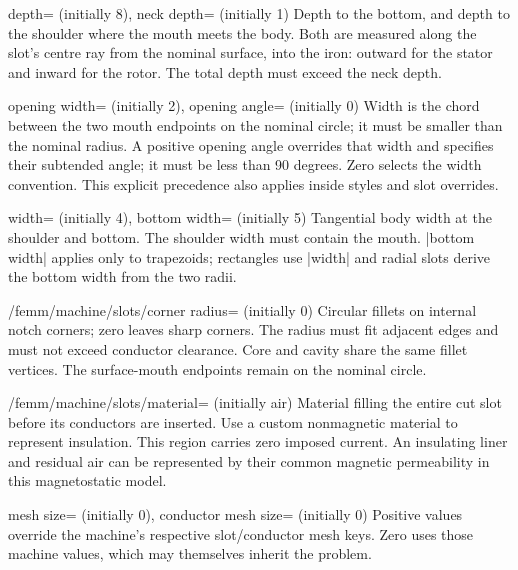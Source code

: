 \begin{keylist}{depth= (initially 8),
 neck depth= (initially 1)}
Depth to the bottom, and depth to the shoulder where the mouth meets the
body. Both are measured along the slot's centre ray from the nominal surface,
into the iron: outward for the stator and inward for the rotor.
The total depth must exceed the neck depth.
\end{keylist}
\begin{keylist}{opening width= (initially 2),
 opening angle= (initially 0)}
Width is the chord between the two mouth endpoints on the nominal circle;
it must be smaller than the nominal radius.
A positive opening angle overrides that width and specifies their subtended
angle; it must be less than 90 degrees. Zero selects the width convention.
This explicit precedence also applies inside styles and slot overrides.
\end{keylist}
\begin{keylist}{width= (initially 4),
 bottom width= (initially 5)}
Tangential body width at the shoulder and bottom. The shoulder width must
contain the mouth. |bottom width| applies only to trapezoids; rectangles use
|width| and radial slots derive the bottom width from the two radii.
\end{keylist}
\begin{key}{/femm/machine/slots/corner radius= (initially 0)}
Circular fillets on internal notch corners; zero leaves sharp corners.
The radius must fit adjacent edges and must not exceed conductor clearance.
Core and cavity share the same fillet vertices. The surface-mouth endpoints
remain on the nominal circle.
\end{key}
\begin{key}{/femm/machine/slots/material= (initially air)}
Material filling the entire cut slot before its conductors are inserted.
Use a custom nonmagnetic material to represent insulation. This region carries
zero imposed current. An insulating liner and residual air can be represented
by their common magnetic permeability in this magnetostatic model.
\end{key}
\begin{keylist}{mesh size= (initially 0),
 conductor mesh size= (initially 0)}
Positive values override the machine's respective slot/conductor mesh keys.
Zero uses those machine values, which may themselves inherit the problem.
\end{keylist}
